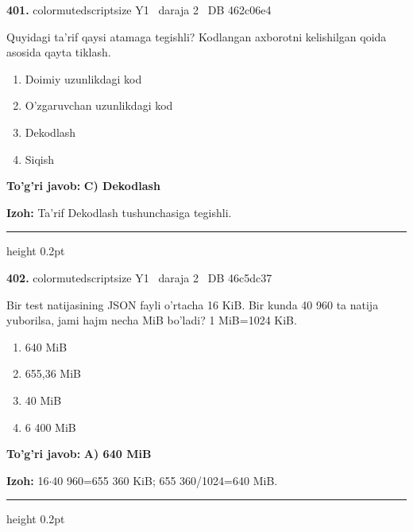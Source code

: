 \documentclass[10pt,a4paper,oneside]{article}
\begin{document}
\noindent\textbf{\color{ink}401.}  {color{muted}scriptsize Y1 \textbullet\ daraja 2 \textbullet\ DB 462c06e4}
\par
Quyidagi ta'rif qaysi atamaga tegishli? Kodlangan axborotni kelishilgan qoida asosida qayta tiklash.
\begin{enumerate}[label=\Alph*),leftmargin=9mm]
\item Doimiy uzunlikdagi kod
\item O'zgaruvchan uzunlikdagi kod
\item Dekodlash
\item Siqish
\end{enumerate}
\begin{tcolorbox}[enhanced,breakable,colback=teal!4,colframe=teal!50!black,boxrule=0.5pt,arc=1.1mm,left=3mm,right=3mm,top=1.7mm,bottom=1.7mm,before skip=2mm,after skip=2mm]
\textbf{\color{teal}To'g'ri javob:} \textbf{C) Dekodlash}
\par\smallskip
\textbf{Izoh:} Ta'rif Dekodlash tushunchasiga tegishli.
\end{tcolorbox}
\vspace{2mm}\hrule height 0.2pt \vspace{3mm}

\noindent\textbf{\color{ink}402.}  {color{muted}scriptsize Y1 \textbullet\ daraja 2 \textbullet\ DB 46c5dc37}
\par
Bir test natijasining JSON fayli o'rtacha 16 KiB. Bir kunda 40 960 ta natija yuborilsa, jami hajm necha MiB bo'ladi? 1 MiB=1024 KiB.
\begin{enumerate}[label=\Alph*),leftmargin=9mm]
\item 640 MiB
\item 655,36 MiB
\item 40 MiB
\item 6 400 MiB
\end{enumerate}
\begin{tcolorbox}[enhanced,breakable,colback=teal!4,colframe=teal!50!black,boxrule=0.5pt,arc=1.1mm,left=3mm,right=3mm,top=1.7mm,bottom=1.7mm,before skip=2mm,after skip=2mm]
\textbf{\color{teal}To'g'ri javob:} \textbf{A) 640 MiB}
\par\smallskip
\textbf{Izoh:} 16\ensuremath{\cdot}40 960=655 360 KiB; 655 360/1024=640 MiB.
\end{tcolorbox}
\vspace{2mm}\hrule height 0.2pt \vspace{3mm}
\end{document}

